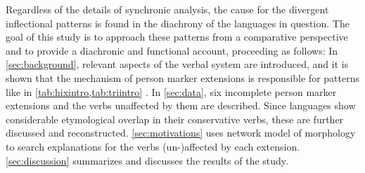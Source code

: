 Regardless of the details of synchronic analysis, the cause for the divergent inflectional patterns is found in the diachrony of the languages in question.
The goal of this study is to approach these patterns from a comparative perspective and to provide a diachronic and functional account, proceeding as follows:
In \cref{sec:background}, relevant aspects of the \PC verbal system are introduced, and it is shown that the mechanism of person marker extensions is responsible for patterns like in \cref{tab:hixintro,tab:triintro} .
In \cref{sec:data}, six incomplete person marker extensions and the verbs unaffected by them are described.
Since languages show considerable etymological overlap in their conservative verbs, these are further discussed and reconstructed.
\cref{sec:motivations} uses  network model of morphology to search explanations for the verbs (un-)affected by each extension.
\cref{sec:discussion} summarizes and discusses the results of the study.

